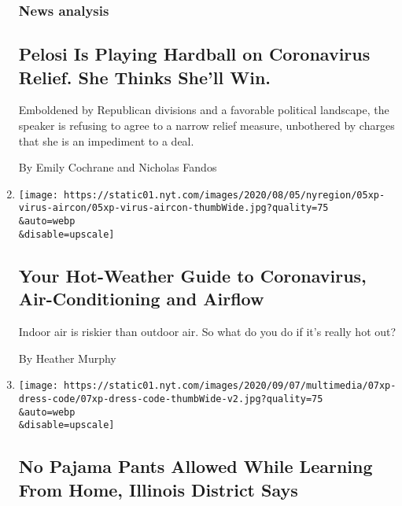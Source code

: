 \begin{enumerate}
  \hypertarget{news-analysis}{%
  \subsubsection{News analysis}\label{news-analysis}}

  \hypertarget{pelosi-is-playing-hardball-on-coronavirus-relief-she-thinks-shell-win}{%
  \subsection{Pelosi Is Playing Hardball on Coronavirus Relief. She
  Thinks She'll
  Win.}\label{pelosi-is-playing-hardball-on-coronavirus-relief-she-thinks-shell-win}}

  Emboldened by Republican divisions and a favorable political
  landscape, the speaker is refusing to agree to a narrow relief
  measure, unbothered by charges that she is an impediment to a deal.

  By Emily Cochrane and Nicholas Fandos
\item
  \href{/2020/08/08/science/coronavirus-spread-air-conditioning.html}{}

  \texttt{[image: https://static01.nyt.com/images/2020/08/05/nyregion/05xp-virus-aircon/05xp-virus-aircon-thumbWide.jpg?quality=75\\\&auto=webp\\\&disable=upscale]}

  \hypertarget{your-hot-weather-guide-to-coronavirus-air-conditioning-and-airflow}{%
  \subsection{Your Hot-Weather Guide to Coronavirus, Air-Conditioning
  and
  Airflow}\label{your-hot-weather-guide-to-coronavirus-air-conditioning-and-airflow}}

  Indoor air is riskier than outdoor air. So what do you do if it's
  really hot out?

  By Heather Murphy
\item
  \href{/2020/08/08/us/pajamas-school-springfield-dress-code.html}{}

  \texttt{[image: https://static01.nyt.com/images/2020/09/07/multimedia/07xp-dress-code/07xp-dress-code-thumbWide-v2.jpg?quality=75\\\&auto=webp\\\&disable=upscale]}

  \hypertarget{no-pajama-pants-allowed-while-learning-from-home-illinois-district-says}{%
  \subsection{No Pajama Pants Allowed While Learning From Home, Illinois
  District
  Says}\label{no-pajama-pants-allowed-while-learning-from-home-illinois-district-says}}


\end{enumerate}
